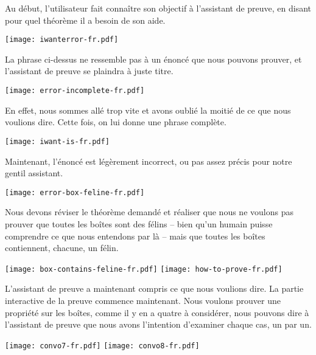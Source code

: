 Au début, l'utilisateur fait connaître son objectif à l'assistant de preuve, en
disant pour quel théorème il a besoin de son aide.

\begin{center}
  \texttt{[image: iwanterror-fr.pdf]}
\end{center}

La phrase ci-dessus ne ressemble pas à un énoncé que nous pouvons prouver, et
l'assistant de preuve se plaindra à juste titre.

\begin{center}
  \texttt{[image: error-incomplete-fr.pdf]}
\end{center}

En effet, nous sommes allé trop vite et avons oublié la moitié de ce que nous
voulions dire. Cette fois, on lui donne une phrase complète.

\begin{center}
  \texttt{[image: iwant-is-fr.pdf]}
\end{center}

Maintenant, l'énoncé est légèrement incorrect, ou pas assez précis pour notre
gentil assistant.

\begin{center}
  \texttt{[image: error-box-feline-fr.pdf]}
\end{center}

Nous devons réviser le théorème demandé et réaliser que nous ne voulons pas
prouver que toutes les boîtes sont des félins -- bien qu'un humain puisse
comprendre ce que nous entendons par là -- mais que toutes les boîtes
contiennent, chacune, un félin.

\begin{center}
  \texttt{[image: box-contains-feline-fr.pdf]}
  \texttt{[image: how-to-prove-fr.pdf]}
\end{center}

L'assistant de preuve a maintenant compris ce que nous voulions dire. La partie
interactive de la preuve commence maintenant. Nous voulons prouver une propriété
sur les boîtes, comme il y en a quatre à considérer, nous pouvons dire à
l'assistant de preuve que nous avons l'intention d'examiner chaque cas, un par
un.

\begin{center}
  \texttt{[image: convo7-fr.pdf]}
  \texttt{[image: convo8-fr.pdf]}
\end{center}

